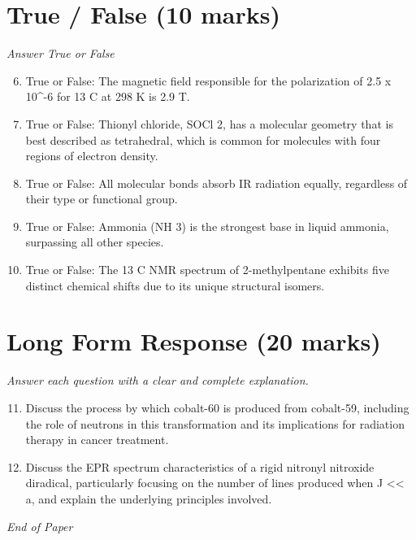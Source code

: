 \documentclass[12pt]{article}
\begin{document}
\section*{True / False (10 marks)}
\textit{Answer True or False}
\begin{enumerate}[label=\arabic*.]
\setcounter{enumi}{5}
\item True or False: The magnetic field responsible for the polarization of 2.5 x 10^-6 for 13 C at 298 K is 2.9 T.
\item True or False: Thionyl chloride, SOCl 2, has a molecular geometry that is best described as tetrahedral, which is common for molecules with four regions of electron density.
\item True or False: All molecular bonds absorb IR radiation equally, regardless of their type or functional group.
\item True or False: Ammonia (NH 3) is the strongest base in liquid ammonia, surpassing all other species.
\item True or False: The 13 C NMR spectrum of 2-methylpentane exhibits five distinct chemical shifts due to its unique structural isomers.
\end{enumerate}

\section*{Long Form Response (20 marks)}
\textit{Answer each question with a clear and complete explanation.}
\begin{enumerate}[label=\arabic*.]
\setcounter{enumi}{10}
\item Discuss the process by which cobalt-60 is produced from cobalt-59, including the role of neutrons in this transformation and its implications for radiation therapy in cancer treatment.
\item Discuss the EPR spectrum characteristics of a rigid nitronyl nitroxide diradical, particularly focusing on the number of lines produced when J \textless{}\textless{} a, and explain the underlying principles involved.
\end{enumerate}

\vfill
\noindent\textit{End of Paper}
\end{document}
